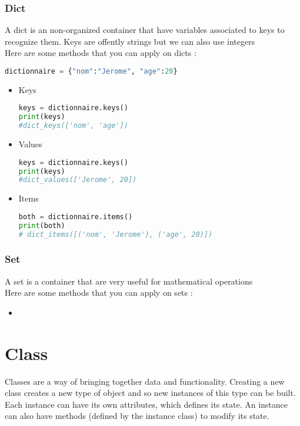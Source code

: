 \documentclass[a4paper, 12pt]{article}
\begin{document}
\subsubsection{Dict}
A dict is an non-organized container that have variables associated to keys to recognize them. Keys are offently strings but we can also use integers\\
Here are some methods that you can apply on dicts : 
\begin{lstlisting}[language=Python]
dictionnaire = {"nom":"Jerome", "age":20}
\end{lstlisting}

\begin{itemize}
\item Keys \\
\begin{lstlisting}[language=Python]
keys = dictionnaire.keys()
print(keys)
#dict_keys(['nom', 'age'])
\end{lstlisting}

\item Values \\
\begin{lstlisting}[language=Python]
keys = dictionnaire.keys()
print(keys)
#dict_values(['Jerome', 20])
\end{lstlisting}

\item Items \\
\begin{lstlisting}[language=Python]
both = dictionnaire.items()
print(both)
# dict_items([('nom', 'Jerome'), ('age', 20)])
\end{lstlisting}
\end{itemize}

\subsubsection{Set}
A set is a container that are very useful for mathematical operations\\
Here are some methods that you can apply on sets : 
\begin{itemize}
\item
\end{itemize}

\newpage
\section{Class}
\label{sec:Class}
Classes are a way of bringing together data and functionality. Creating a new class creates a new type of object and so new instances of this type can be built. Each instance can have its own attributes, which defines its state. An instance can also have methods (defined by the instance class) to modify its state.\newline
\end{document}
